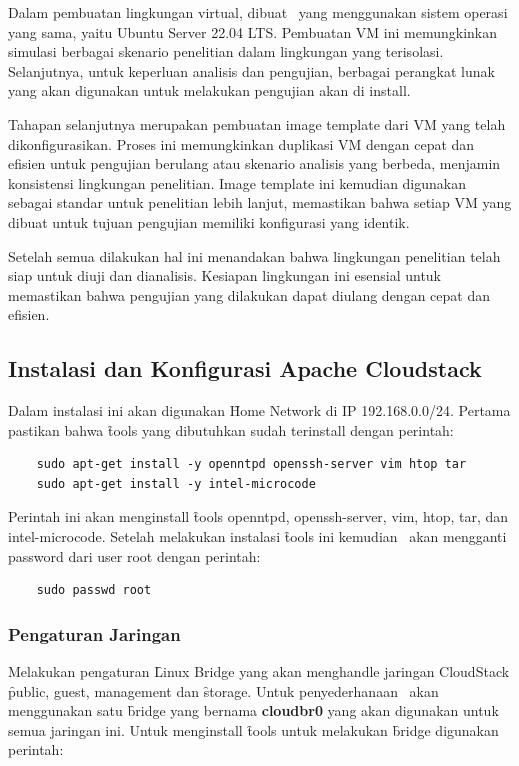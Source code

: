 Dalam pembuatan lingkungan virtual, dibuat \vm\ yang menggunakan sistem operasi yang sama, yaitu Ubuntu Server 22.04 LTS. Pembuatan VM ini memungkinkan simulasi berbagai skenario penelitian dalam lingkungan yang terisolasi. Selanjutnya, untuk keperluan analisis dan pengujian, berbagai perangkat lunak yang akan digunakan untuk melakukan pengujian akan di install.

Tahapan selanjutnya merupakan pembuatan image template dari VM yang telah dikonfigurasikan. Proses ini memungkinkan duplikasi VM dengan cepat dan efisien untuk pengujian berulang atau skenario analisis yang berbeda, menjamin konsistensi lingkungan penelitian. Image template ini kemudian digunakan sebagai standar untuk penelitian lebih lanjut, memastikan bahwa setiap VM yang dibuat untuk tujuan pengujian memiliki konfigurasi yang identik.

Setelah semua dilakukan hal ini menandakan bahwa lingkungan penelitian telah siap untuk diuji dan dianalisis. Kesiapan lingkungan ini esensial untuk memastikan bahwa pengujian yang dilakukan dapat diulang dengan cepat dan efisien.

\subsection{Instalasi dan Konfigurasi Apache Cloudstack}
Dalam instalasi ini akan digunakan \f{Home Network} di IP 192.168.0.0/24. Pertama pastikan bahwa \f{tools} yang dibutuhkan sudah terinstall dengan perintah:

\begin{lstlisting}
    sudo apt-get install -y openntpd openssh-server vim htop tar
    sudo apt-get install -y intel-microcode
\end{lstlisting}

Perintah ini akan menginstall \f{tools} openntpd, openssh-server, vim, htop, tar, dan intel-microcode. Setelah melakukan instalasi \f{tools} ini kemudian \saya\ akan mengganti password dari user root dengan perintah:

\begin{lstlisting}
    sudo passwd root
\end{lstlisting}

\subsubsection{Pengaturan Jaringan}
Melakukan pengaturan \f{Linux Bridge} yang akan menghandle jaringan CloudStack \f{public, guest, management} dan \f{storage}. Untuk penyederhanaan \saya\ akan menggunakan satu \f{bridge} yang bernama \textbf{cloudbr0} yang akan digunakan untuk semua jaringan ini. Untuk menginstall \f{tools} untuk melakukan \f{bridge} digunakan perintah:

